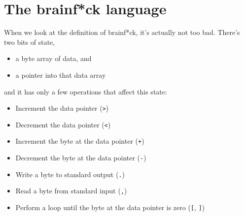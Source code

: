 \documentclass{article}
\begin{document}
\section{The brainf*ck language}
When we look at the definition of brainf*ck, it's actually not too bad. There's two bits of state,

\begin{itemize}
\item a byte array of data, and
\item a pointer into that data array
\end{itemize}

and it has only a few operations that affect this state:
\begin{itemize}
\item Increment the data pointer (\verb|>|)

\item Decrement the data pointer (\verb|<|)

\item Increment the byte at the data pointer (\verb|+|)

\item Decrement the byte at the data pointer (\verb|-|)

\item Write a byte to standard output (\verb|.|)

\item Read a byte from standard input (\verb|,|)

\item Perform a loop until the byte at the data pointer is zero (\verb|[|, \verb|]|)
\end{itemize}
\end{document}
